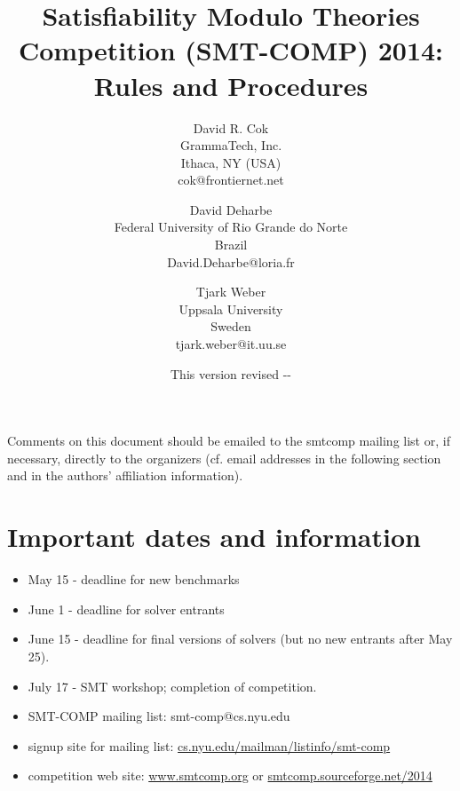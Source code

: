 \documentclass[12pt]{article}
\begin{document}
\date{\small This version revised \the\year-\the\month-\the\day}

\title{Satisfiability Modulo Theories Competition (SMT-COMP) 2014: Rules and 
Procedures}


\def\doauthor#1{{%
  \hsize.5\hsize \advance\hsize by-1cm %
  \def\\{\hss\egroup\hbox to\hsize\bgroup\strut\hss}%
  \vbox{\hbox to\hsize\bgroup\strut\hss#1\hss\egroup}}}%

\def\header#1{\medskip\noindent\textbf{#1}}

\author{
David R. Cok \\
GrammaTech, Inc. \\
Ithaca, NY (USA) \\
cok@frontiernet.net \\
\and
David Deharbe \\
Federal University of Rio Grande do Norte \\
Brazil \\
David.Deharbe@loria.fr \\
\and
Tjark Weber \\
Uppsala University \\
Sweden \\
tjark.weber@it.uu.se \\ 
}



\maketitle

\def\eg{\textit{e.g.}}
\def\ie{\textit{i.e.}}

\noindent Comments on this document should be emailed to the smtcomp mailing
list or, if necessary, directly to the organizers (cf. email addresses in the following section and in the authors' affiliation information).

\section{Important dates and information}
\begin{itemize}
\item May 15 - deadline for new benchmarks
\item June 1 - deadline for solver entrants
\item June 15 - deadline for final versions of solvers (but no new entrants after May 25).
\item July 17 - SMT workshop; completion of competition.
\item SMT-COMP mailing list: smt-comp@cs.nyu.edu
\item signup site for mailing list: \url{cs.nyu.edu/mailman/listinfo/smt-comp}
\item competition web site: \url{www.smtcomp.org}  or \url{smtcomp.sourceforge.net/2014}
\end{itemize}
\end{document}
